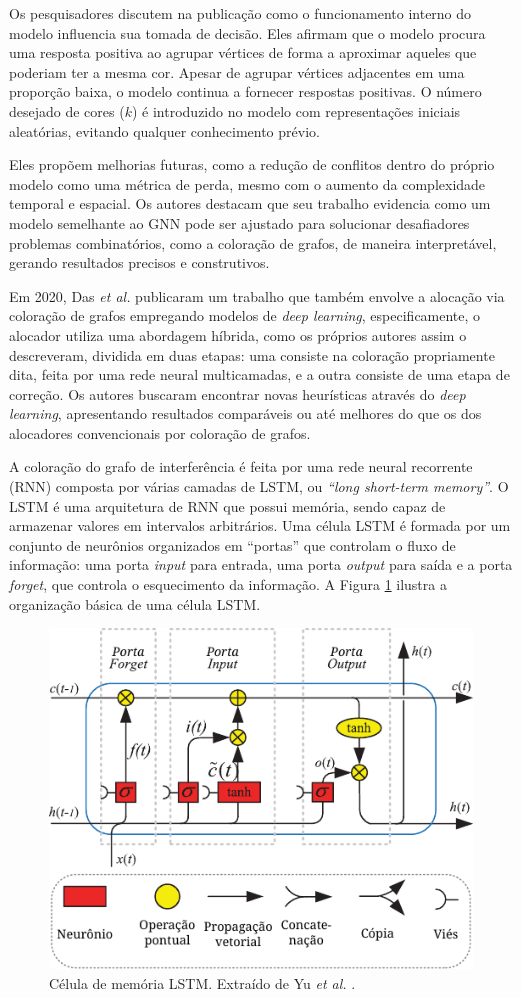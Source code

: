 \documentclass[
	12pt,				%
	openright,			%
	twoside,			%
	a4paper,			%
	tcc,			%
	]{ABNT-DC-UEL}
\begin{document}
Os pesquisadores discutem na publicação como o funcionamento interno do modelo influencia sua tomada de decisão. Eles afirmam que o modelo procura uma resposta positiva ao agrupar vértices de forma a aproximar aqueles que poderiam ter a mesma cor. Apesar de agrupar vértices adjacentes em uma proporção baixa, o modelo continua a fornecer respostas positivas. O número desejado de cores ($k$) é introduzido no modelo com representações iniciais aleatórias, evitando qualquer conhecimento prévio.

Eles propõem melhorias futuras, como a redução de conflitos dentro do próprio modelo como uma métrica de perda, mesmo com o aumento da complexidade temporal e espacial. Os autores destacam que seu trabalho evidencia como um modelo semelhante ao GNN pode ser ajustado para solucionar desafiadores problemas combinatórios, como a coloração de grafos, de maneira interpretável, gerando resultados precisos e construtivos.

Em 2020, Das \textit{et al.} \cite{das:20} publicaram um trabalho que também envolve a alocação via coloração de grafos empregando modelos de \textit{deep learning}, especificamente, o alocador utiliza uma abordagem híbrida, como os próprios autores assim o descreveram, dividida em duas etapas: uma consiste na coloração propriamente dita, feita por uma rede neural multicamadas, e a outra consiste de uma etapa de correção. Os autores buscaram encontrar novas heurísticas através do \textit{deep learning}, apresentando resultados comparáveis ou até melhores do que os dos alocadores convencionais por coloração de grafos.

A coloração do grafo de interferência é feita por uma rede neural recorrente (RNN) composta por várias camadas de LSTM, ou \textit{``long short-term memory''}. O LSTM é uma arquitetura de RNN que possui memória, sendo capaz de armazenar valores em intervalos arbitrários. Uma célula LSTM é formada por um conjunto de neurônios organizados em ``portas'' que controlam o fluxo de informação: uma porta \textit{input} para entrada, uma porta \textit{output} para saída e a porta \textit{forget}, que controla o esquecimento da informação. A Figura \ref{fig:lstm} ilustra a organização básica de uma célula LSTM.

\begin{figure}[hbt]
    \centering
    \includegraphics[width=.7\textwidth]{lstm}
    \caption{Célula de memória LSTM. Extraído de Yu \textit{et al.} \cite{yu:19}.}
    \label{fig:lstm}
\end{figure}
\end{document}
